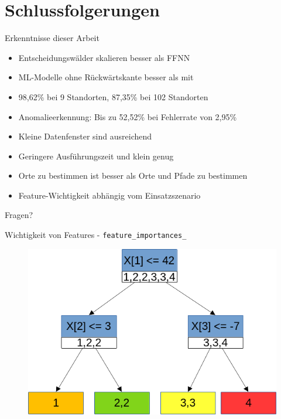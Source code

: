 \documentclass[10pt]{beamer}
\begin{document}
\section{Schlussfolgerungen}
\begin{frame}{Erkenntnisse dieser Arbeit}
    \begin{itemize}
        \item Entscheidungswälder skalieren besser als FFNN
        \item ML-Modelle ohne Rückwärtskante besser als mit
        \item 98,62\% bei 9 Standorten, 87,35\% bei 102 Standorten
        \item Anomalieerkennung: Bis zu 52,52\% bei Fehlerrate von 2,95\%
        \item Kleine Datenfenster sind ausreichend
        \item Geringere Ausführungszeit und klein genug
        \item Orte zu bestimmen ist besser als Orte und Pfade zu bestimmen
        \item Feature-Wichtigkeit abhängig vom Einsatzszenario
    \end{itemize}
\end{frame}

\begin{frame}[standout]
  Fragen?
\end{frame}

\begin{frame}{Wichtigkeit von Features - \texttt{feature\_importances\_}}
    \begin{figure}
        \centering
        \includegraphics[width=\linewidth]{model/feature_importances.png}
    \end{figure}
\end{frame}
\end{document}
